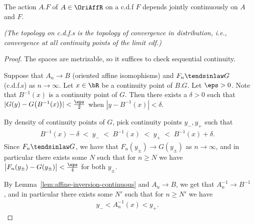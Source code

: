 \begin{lemma}
  \label{lem:action-on-cdf-continuous}
  \leanok
  The action $A . F$ of $A \in \OriAffR$ on a c.d.f $F$ depends
  jointly continuously on $A$ and $F$.

  \emph{(The topology on c.d.f.s is the topology of convergence in distribution, i.e.,
  convergence at all continuity points of the limit cdf.)}
\end{lemma}
\begin{proof}
  The spaces are metrizable, so it suffices to check sequential continuity.

  Suppose that $A_n \to B$ (oriented affine isomophisms)
  and $F_n \tendsinlaw G$ (c.d.f.s) as $n \to \infty$.
  Let $x \in \bR$ be a continuity point of $B.G$.
  Let $\eps > 0$. Note that $B^{-1}(x)$ is a continuity point of $G$.
  Then there exists a $\delta > 0$ such that $|G(y) - G\big(B^{-1}(x)\big)| < \frac{\eps}{2}$
  when $|y-B^{-1}(x)|<\delta$.

  By density of continuity points of $G$, pick continuity points
  $y_-,y_+$ such that
  \begin{align*}
    B^{-1}(x)-\delta \; < \; y_- \; < \; B^{-1}(x) \; < \; y_+ \; < \; B^{-1}(x)+\delta .
  \end{align*}
  Since $F_n \tendsinlaw G$, we have that
  $F_n(y_\pm) \to G(y_\pm)$ as $n \to \infty$,
  and in particular there exists some $N$ such that for $n \ge N$
  we have $\big| F_n(y_\pm) - G(y_\pm) \big| < \frac{\eps}{4}$ for both $y_\pm$.

  By Lemma~\ref{lem:affine-inversion-continuous}
  and $A_n \to B$, we get that $A_n^{-1} \to B^{-1}$, and in particular
  there exists some $N'$ such that for $n \ge N'$ we have
  \begin{align*}
    y_- < A_n^{-1}(x) < y_+ .
  \end{align*}


\end{proof}
